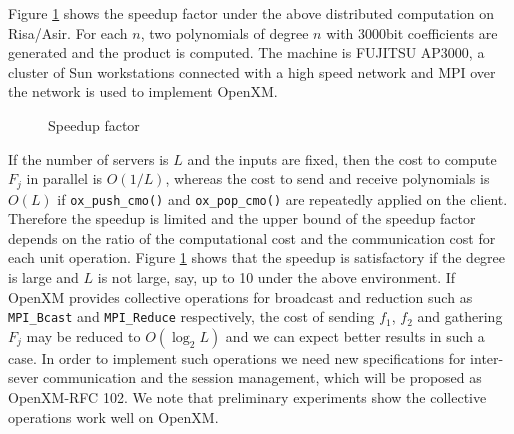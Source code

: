 Figure \ref{speedup}
shows the speedup factor under the above distributed computation
on Risa/Asir. For each $n$, two polynomials of degree $n$
with 3000bit coefficients are generated and the product is computed.
The machine is FUJITSU AP3000,
a cluster of Sun workstations connected with a high speed network 
and MPI over the network is used to implement OpenXM.
\begin{figure}[htbp]
\epsfxsize=8.5cm
\caption{Speedup factor}
\label{speedup}
\end{figure}

If the number of servers is $L$ and the inputs are fixed, then the cost to
compute $F_j$ in parallel is $O(1/L)$, whereas the cost
to send and receive polynomials is $O(L)$ if {\tt ox\_push\_cmo()} and
{\tt ox\_pop\_cmo()} are repeatedly applied on the client.
Therefore the speedup is limited and the upper bound of
the speedup factor depends on the ratio of 
the computational cost and the communication cost for each unit operation.
Figure \ref{speedup} shows that 
the speedup is satisfactory if the degree is large and $L$
is not large, say, up to 10 under the above environment.
If OpenXM provides collective operations for broadcast and reduction
such as {\tt MPI\_Bcast} and {\tt MPI\_Reduce} respectively, the cost of 
sending $f_1$, $f_2$ and gathering $F_j$ may be reduced to $O(\log_2L)$
and we can expect better results in such a case. In order to implement
such operations we need new specifications for inter-sever communication
and the session management, which will be proposed as OpenXM-RFC 102.
We note that preliminary experiments show the collective operations
work well on OpenXM.

%
%
%


